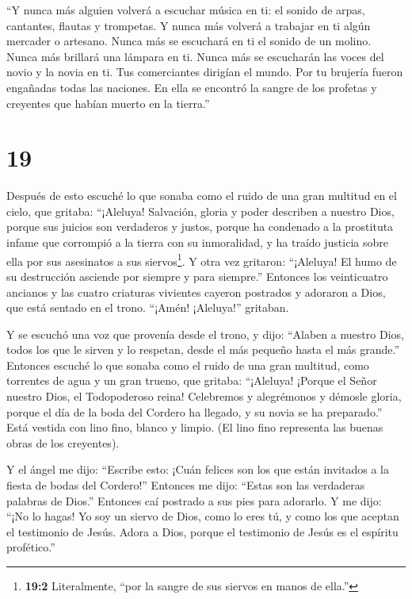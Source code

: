  ``Y nunca más alguien volverá a escuchar música en ti: el
sonido de arpas, cantantes, flautas y trompetas. Y nunca más volverá a
trabajar en ti algún mercader o artesano. Nunca más se escuchará en ti
el sonido de un molino.  Nunca más brillará una lámpara en
ti. Nunca más se escucharán las voces del novio y la novia en ti. Tus
comerciantes dirigían el mundo. Por tu brujería fueron engañadas todas
las naciones.  En ella se encontró la sangre de los
profetas y creyentes que habían muerto en la tierra.''

\hypertarget{section-18}{%
\section{19}\label{section-18}}

 Después de esto escuché lo que sonaba como el ruido de una
gran multitud en el cielo, que gritaba: ``¡Aleluya! Salvación, gloria y
poder describen a nuestro Dios,  porque sus juicios son
verdaderos y justos, porque ha condenado a la prostituta infame que
corrompió a la tierra con su inmoralidad, y ha traído justicia sobre
ella por sus asesinatos a sus siervos\footnote{\textbf{19:2}
  Literalmente, ``por la sangre de sus siervos en manos de ella.''}.
 Y otra vez gritaron: ``¡Aleluya! El humo de su destrucción
asciende por siempre y para siempre.''  Entonces los
veinticuatro ancianos y las cuatro criaturas vivientes cayeron postrados
y adoraron a Dios, que está sentado en el trono. ``¡Amén! ¡Aleluya!''
gritaban.

 Y se escuchó una voz que provenía desde el trono, y dijo:
``Alaben a nuestro Dios, todos los que le sirven y lo respetan, desde el
más pequeño hasta el más grande.''  Entonces escuché lo que
sonaba como el ruido de una gran multitud, como torrentes de agua y un
gran trueno, que gritaba: ``¡Aleluya! ¡Porque el Señor nuestro Dios, el
Todopoderoso reina!  Celebremos y alegrémonos y démosle
gloria, porque el día de la boda del Cordero ha llegado, y su novia se
ha preparado.''  Está vestida con lino fino, blanco y
limpio. (El lino fino representa las buenas obras de los creyentes).

 Y el ángel me dijo: ``Escribe esto: ¡Cuán felices son los
que están invitados a la fiesta de bodas del Cordero!'' Entonces me
dijo: ``Estas son las verdaderas palabras de Dios.'' 
Entonces caí postrado a sus pies para adorarlo. Y me dijo: ``¡No lo
hagas! Yo soy un siervo de Dios, como lo eres tú, y como los que aceptan
el testimonio de Jesús. Adora a Dios, porque el testimonio de Jesús es
el espíritu profético.''

